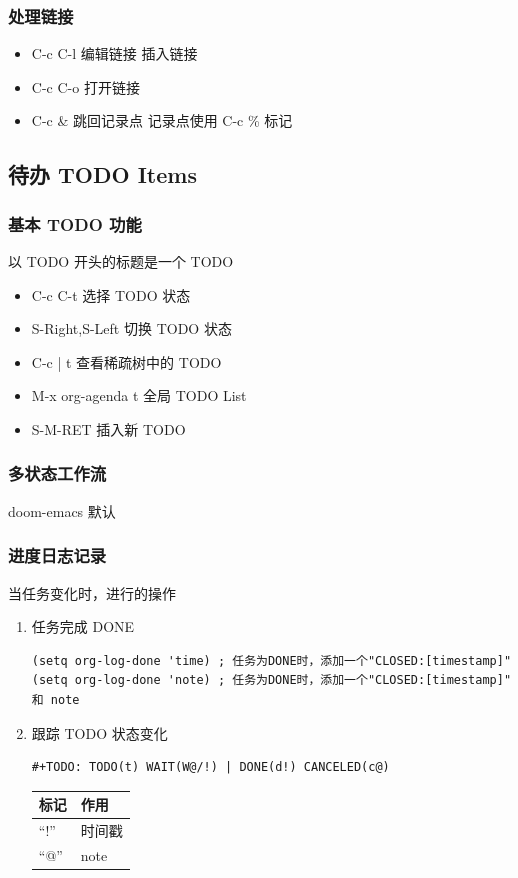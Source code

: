 \documentclass[11pt]{article}
\begin{document}
\subsubsection{处理链接}
\label{sec:org7547868}
\begin{itemize}
\item C-c C-l
编辑链接
插入链接
\item C-c C-o
打开链接
\item C-c \&
跳回记录点
记录点使用 C-c \% 标记
\end{itemize}

\subsection{待办 TODO Items}
\label{sec:org4ca4e5f}
\subsubsection{基本 TODO 功能}
\label{sec:org0e4ee7e}
以 TODO 开头的标题是一个 TODO

\begin{itemize}
\item C-c C-t
选择 TODO 状态
\item S-Right,S-Left
切换 TODO 状态
\item C-c | t
查看稀疏树中的 TODO
\item M-x org-agenda t
全局 TODO List
\item S-M-RET
插入新 TODO
\end{itemize}

\subsubsection{多状态工作流}
\label{sec:org2aea1d2}
doom-emacs 默认

\subsubsection{进度日志记录}
\label{sec:org38c6e04}
当任务变化时，进行的操作

\begin{enumerate}
\item 任务完成 DONE
\label{sec:org5f74535}
\begin{verbatim}
(setq org-log-done 'time) ; 任务为DONE时，添加一个"CLOSED:[timestamp]"
(setq org-log-done 'note) ; 任务为DONE时，添加一个"CLOSED:[timestamp]" 和 note
\end{verbatim}

\item 跟踪 TODO 状态变化
\label{sec:orgc37f033}
\begin{verbatim}
#+TODO: TODO(t) WAIT(W@/!) | DONE(d!) CANCELED(c@)
\end{verbatim}

\begin{center}
\begin{tabular}{ll}
标记 & 作用\\[0pt]
\hline
``!'' & 时间戳\\[0pt]
``@'' & note\\[0pt]
\end{tabular}
\end{center}
\end{enumerate}
\end{document}
